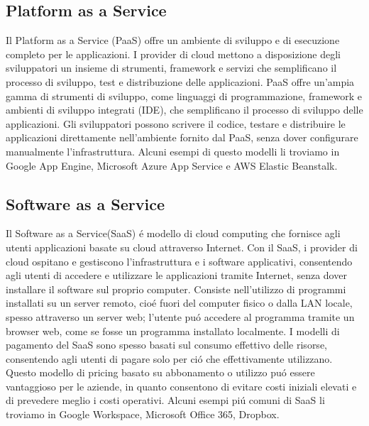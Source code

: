 \documentclass[../../main.tex]{subfiles}
\begin{document}
\subsection{Platform as a Service}
Il Platform as a Service (PaaS) offre un ambiente di sviluppo e di esecuzione completo per le applicazioni. I provider di cloud mettono a disposizione degli sviluppatori un insieme di strumenti, framework e servizi che semplificano il processo di sviluppo, test e distribuzione delle applicazioni.
PaaS offre un'ampia gamma di strumenti di sviluppo, come linguaggi di programmazione, framework e ambienti di sviluppo integrati (IDE), che semplificano il processo di sviluppo delle applicazioni. Gli sviluppatori possono scrivere il codice, testare e distribuire le applicazioni direttamente nell'ambiente fornito dal PaaS, senza dover configurare manualmente l'infrastruttura.
Alcuni esempi di questo modelli li troviamo in Google App Engine, Microsoft Azure App Service e AWS Elastic Beanstalk.

\subsection{Software as a Service}
Il Software as a Service(SaaS) é modello di cloud computing che fornisce agli utenti applicazioni basate su cloud attraverso Internet. Con il SaaS, i provider di cloud ospitano e gestiscono l'infrastruttura e i software applicativi, consentendo agli utenti di accedere e utilizzare le applicazioni tramite Internet, senza dover installare il software sul proprio computer.
Consiste nell'utilizzo di programmi installati su un server remoto, cioé fuori del computer fisico o dalla LAN locale, spesso attraverso un server web; l'utente puó accedere al programma tramite un browser web, come se fosse un programma installato localmente.
I modelli di pagamento del SaaS sono spesso basati sul consumo effettivo delle risorse, consentendo agli utenti di pagare solo per ció che effettivamente utilizzano. Questo modello di pricing basato su abbonamento o utilizzo puó essere vantaggioso per le aziende, in quanto consentono di evitare costi iniziali elevati e di prevedere meglio i costi operativi.
Alcuni esempi piú comuni di SaaS li troviamo in Google Workspace, Microsoft Office 365, Dropbox.
\end{document}
